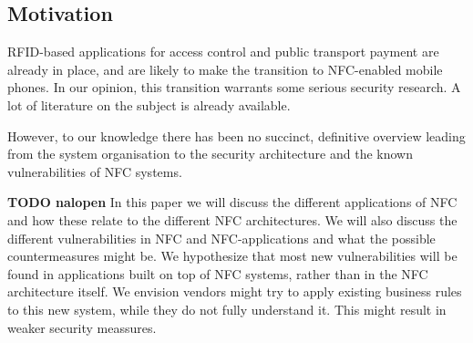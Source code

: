 
\subsection{Motivation}
RFID-based applications for access control and public transport payment are already in place, and are likely to make the transition to NFC-enabled mobile phones. In our opinion, this transition warrants some serious security research. A lot of literature on the subject is already available.

However, to our knowledge there has been no succinct, definitive overview leading from the system organisation to the security architecture and the known vulnerabilities of NFC systems.



\textbf{TODO nalopen}
In this paper we will discuss the different applications of NFC and how these relate to the different NFC architectures. We will also discuss the different vulnerabilities in NFC and NFC-applications and what the possible countermeasures might be. We hypothesize that most new vulnerabilities will be found in applications built on top of NFC systems, rather than in the NFC architecture itself. We envision vendors might try to apply existing business rules to this new system, while they do not fully understand it. This might result in weaker security meassures.


